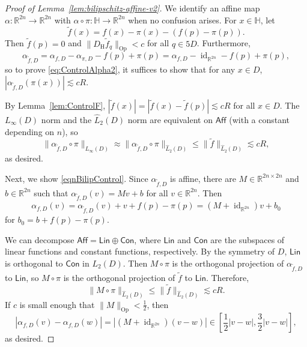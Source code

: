 \documentclass[12pt,reqno]{amsart}
\newcommand{\Aff}{\mathsf{Aff}}
\newcommand{\Lin}{\mathsf{Lin}}
\newcommand{\Con}{\mathsf{Con}}
\DeclareMathOperator{\Op}{Op}
\newcommand{\HH}{\mathbb{H}}
\newcommand{\R}{\mathbb{R}}
\newcommand{\from}{\colon}
\theoremstyle{remark}
\newcommand{\0}{\mathbf{0}}
\renewcommand{\1}{\mathbf 1}
\DeclareMathOperator{\id}{id}
\begin{document}
\begin{proof}[Proof of Lemma~\ref{lem:bilipschitz-affine-v2}]
  We identify an affine map $\alpha\from\R^{2n}\to\R^{2n}$ with
$\alpha\circ\pi\from\HH\to\R^{2n}$ when no confusion arises. For $x\in \HH$, let
  $$\tilde f(x)=f(x)-\pi(x)-(f(p)-\pi(p)).$$
  Then $\tilde{f}(p) = 0$ and $\|D_{\mathrm{H}}\tilde{f}_q\|_{\mathrm{Op}}<c$ for all $q\in 5D$. Furthermore, 
  $$\alpha_{\tilde{f},D} = \alpha_{f,D} - \alpha_{\pi,D} - f(p) + \pi(p) = \alpha_{f,D} - \id_{\R^{2n}} - f(p) + \pi(p),$$
  so to prove \eqref{eq:ControlAlpha2}, it suffices to show that for any $x\in D$, $|\alpha_{\tilde{f},D}(\pi(x))| \lesssim cR$.
  
  By Lemma~\ref{lem:ControlF}, $|\tilde{f}(x)| = |\tilde{f}(x) - \tilde{f}(p)| \lesssim cR$ for all $x\in D$. 
  The $L_\infty(D)$ norm and the $\widehat{L}_2(D)$ norm are equivalent on $\Aff$ (with a constant depending on $n$), so 
  $$\|\alpha_{\tilde{f},D}\circ \pi\|_{L_\infty(D)} \approx  \|\alpha_{\tilde{f},D} \circ \pi\|_{\widehat{L}_2(D)} \le \|\tilde{f} \|_{\widehat{L}_2(D)} \lesssim cR,$$
  as desired.
  
  Next, we show \eqref{eqnBilipControl}. Since $\alpha_{\tilde{f},D}$ is affine, there are $M\in \R^{2n\times 2n}$ and $b\in \R^{2n}$ such that $\alpha_{\tilde{f},D}(v) = Mv + b$ for all $v\in \R^{2n}$. Then
  $$\alpha_{f,D}(v) = \alpha_{\tilde{f},D}(v) + v + f(p) - \pi(p) = (M + \id_{\R^{2n}})v + b_0$$
  for $b_0 = b + f(p) - \pi(p)$.
  
  We can decompose $\Aff = \Lin \oplus \Con$, where $\Lin$ and $\Con$ are the subspaces of linear functions and constant functions, respectively. By the symmetry of $D$, $\Lin$ is orthogonal to $\Con$ in $L_2(D)$. Then $M\circ \pi$ is the orthogonal projection of $\alpha_{\tilde{f},D}$ to $\Lin$, so $M\circ \pi$ is the orthogonal projection of $\tilde{f}$ to $\Lin$. Therefore,
  $$\|M\circ \pi\|_{\widehat{L}_2(D)} \le \|\tilde{f} \|_{\widehat{L}_2(D)} \lesssim cR.$$
  If $c$ is small enough that $\|M\|_{\Op} < \frac{1}{2}$, then
  $$|\alpha_{f,D}(v) - \alpha_{f,D}(w)| = |(M+\id_{\R^{2n}})(v-w)| \in \left[\frac{1}{2} |v-w|, \frac{3}{2} |v-w|\right],$$
  as desired.
\end{proof}
\end{document}
